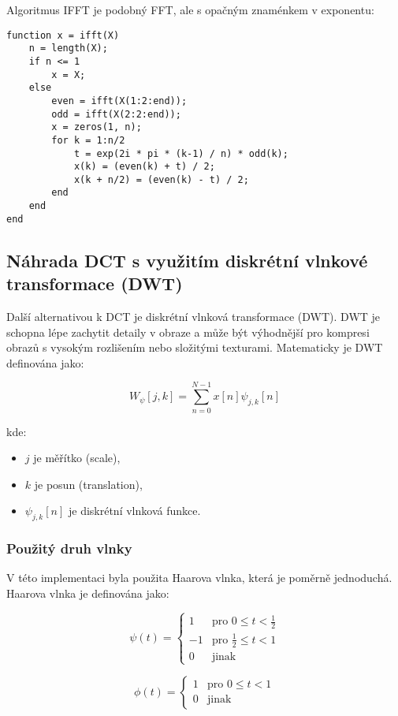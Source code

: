 Algoritmus IFFT je podobný FFT, ale s opačným znaménkem v exponentu:
\begin{verbatim}
function x = ifft(X)
    n = length(X);
    if n <= 1
        x = X;
    else
        even = ifft(X(1:2:end));
        odd = ifft(X(2:2:end));
        x = zeros(1, n);
        for k = 1:n/2
            t = exp(2i * pi * (k-1) / n) * odd(k);
            x(k) = (even(k) + t) / 2;
            x(k + n/2) = (even(k) - t) / 2;
        end
    end
end
\end{verbatim}

\subsection{Náhrada DCT s využitím diskrétní vlnkové transformace (DWT)}

Další alternativou k DCT je diskrétní vlnková transformace (DWT). DWT je schopna lépe zachytit detaily v obraze a může být výhodnější pro kompresi obrazů s vysokým rozlišením nebo složitými texturami.\cite{WaveletWiki} Matematicky je DWT definována jako:

\[
W_{\psi}[j, k] = \sum_{n=0}^{N-1} x[n] \psi_{j,k}[n]
\]

kde:
\begin{itemize}
    \item \(j\) je měřítko (scale),
    \item \(k\) je posun (translation),
    \item \(\psi_{j,k}[n]\) je diskrétní vlnková funkce.
\end{itemize}

\subsubsection{Použitý druh vlnky}
V této implementaci byla použita Haarova vlnka, která je poměrně jednoduchá. Haarova vlnka je definována jako:

\[
\psi(t) = \begin{cases} 
1 & \text{pro } 0 \leq t < \frac{1}{2} \\
-1 & \text{pro } \frac{1}{2} \leq t < 1 \\
0 & \text{jinak}
\end{cases}
\]

\[
\phi(t) = \begin{cases} 
1 & \text{pro } 0 \leq t < 1 \\
0 & \text{jinak}
\end{cases}
\]

